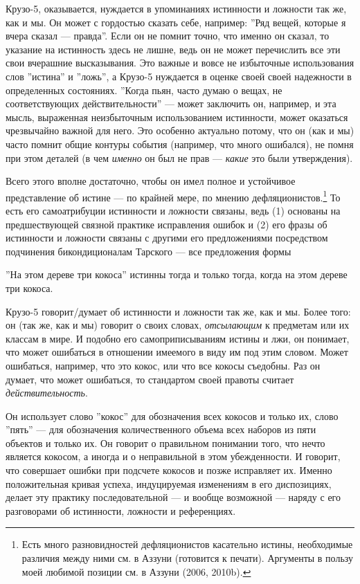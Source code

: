 \documentclass[11pt]{book}
\begin{document}
Крузо-5, оказывается, нуждается в упоминаниях истинности и ложности так же, как и мы. Он может с гордостью сказать себе, например: ''Ряд вещей, которые я вчера сказал --- правда''. Если он не помнит точно, что именно он сказал, то указание на истинность здесь не лишне, ведь он не может перечислить все эти свои вчерашние высказывания. Это важные и вовсе не избыточные использования слов ''истина'' и ''ложь'', а Крузо-5 нуждается в оценке своей своей надежности в определенных состояниях. ''Когда пьян, часто думаю о вещах, не соответствующих действительности'' --- может заключить он, например, и эта мысль, выраженная неизбыточным использованием истинности, может оказаться чрезвычайно важной для него. Это особенно актуально потому, что он (как и мы) часто помнит общие контуры события (например, что много ошибался), не помня при этом деталей (в чем \textit{именно} он был не прав --- \textit{какие} это были утверждения).

Всего этого вполне достаточно, чтобы он имел полное и устойчивое представление об истине --- по крайней мере, по мнению дефляционистов.\footnote{Есть много разновидностей дефляционистов касательно истины, необходимые различия между ними см. в Аззуни (готовится к печати). Аргументы в пользу моей любимой позиции см. в Аззуни (2006, 2010b).} То есть его самоатрибуции истинности и ложности связаны, ведь (1) основаны на предшествующей связной практике исправления ошибок и (2) его фразы об истинности и ложности связаны с другими его предложениями посредством подчинения бикондиционалам Тарского --- все предложения формы

\smallskip

''На этом дереве три кокоса'' истинны тогда и только тогда, когда на этом дереве три кокоса.

\smallskip

Крузо-5 говорит/думает об истинности и ложности так же, как и мы. Более того: он (так же, как и мы) говорит о своих словах, \textit{отсылающим} к предметам или их классам в мире. И подобно его самоприписываниям истины и лжи, он понимает, что может ошибаться в отношении имеемого в виду им под этим словом. Может ошибаться, например, что это кокос, или что все кокосы съедобны. Раз он думает, что может ошибаться, то стандартом своей правоты считает \textit{действительность}.

Он использует слово ''кокос'' для обозначения всех кокосов и только их, слово ''пять'' --- для обозначения количественного объема всех наборов из пяти объектов и только их. Он говорит о правильном понимании того, что нечто является кокосом, а иногда и о неправильной в этом убежденности. И говорит, что совершает ошибки при подсчете кокосов и позже исправляет их. Именно положительная кривая успеха, индуцируемая изменениям в его диспозициях, делает эту практику последовательной --- и вообще возможной --- наряду с его разговорами об истинности, ложности и референциях.
\end{document}
